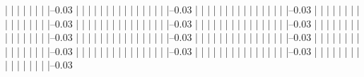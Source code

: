             |          |          |          |          |          |          |          |--0.03%
            |          |          |          |          |          |          |          |          
            |          |          |          |          |          |          |          |--0.03%
            |          |          |          |          |          |          |          |          
            |          |          |          |          |          |          |          |--0.03%
            |          |          |          |          |          |          |          |          
            |          |          |          |          |          |          |          |--0.03%
            |          |          |          |          |          |          |          |          
            |          |          |          |          |          |          |          |--0.03%
            |          |          |          |          |          |          |          |          
            |          |          |          |          |          |          |          |--0.03%
            |          |          |          |          |          |          |          |          
            |          |          |          |          |          |          |          |--0.03%
            |          |          |          |          |          |          |          |          
            |          |          |          |          |          |          |          |--0.03%
            |          |          |          |          |          |          |          |          
            |          |          |          |          |          |          |          |--0.03%
            |          |          |          |          |          |          |          |          
            |          |          |          |          |          |          |          |--0.03%
            |          |          |          |          |          |          |          |          
            |          |          |          |          |          |          |          |--0.03%
            |          |          |          |          |          |          |          |          
            |          |          |          |          |          |          |          |--0.03%
            |          |          |          |          |          |          |          |          
            |          |          |          |          |          |          |          |--0.03%
